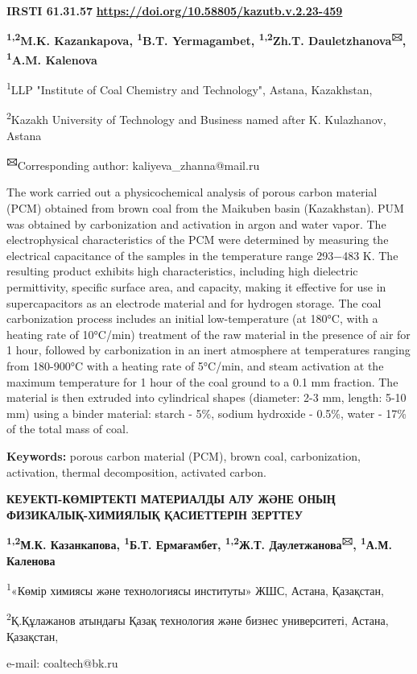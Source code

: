 \newpage
{\bfseries IRSTI 61.31.57}
\hfill {\bfseries \href{https://doi.org/10.58805/kazutb.v.2.23-459}{https://doi.org/10.58805/kazutb.v.2.23-459}}


\begin{center}
{\bfseries \textsuperscript{1,2}M.K. Kazankapova, \textsuperscript{1}B.T. Yermagambet, \textsuperscript{1,2}Zh.T. Dauletzhanova\textsuperscript{🖂}, \textsuperscript{1}A.M. Kalenova}

\textsuperscript{1}LLP "Institute of Coal Chemistry and Technology",
Astana, Kazakhstan,

\textsuperscript{2}Kazakh University of Technology and Business named
after K. Kulazhanov, Astana

{\bfseries \textsuperscript{🖂}}Corresponding author:
kaliyeva\_zhanna@mail.ru
\end{center}

The work carried out a physicochemical analysis of porous carbon
material (PCM) obtained from brown coal from the Maikuben basin
(Kazakhstan). PUM was obtained by carbonization and activation in argon
and water vapor. The electrophysical characteristics of the PCM were
determined by measuring the electrical capacitance of the samples in the
temperature range 293−483 K. The resulting product exhibits high
characteristics, including high dielectric permittivity, specific
surface area, and capacity, making it effective for use in
supercapacitors as an electrode material and for hydrogen storage. The
coal carbonization process includes an initial low-temperature (at
180°C, with a heating rate of 10°C/min) treatment of the raw material in
the presence of air for 1 hour, followed by carbonization in an inert
atmosphere at temperatures ranging from 180-900°C with a heating rate of
5°C/min, and steam activation at the maximum temperature for 1 hour of
the coal ground to a 0.1 mm fraction. The material is then extruded into
cylindrical shapes (diameter: 2-3 mm, length: 5-10 mm) using a binder
material: starch - 5\%, sodium hydroxide - 0.5\%, water - 17\% of the
total mass of coal.

{\bfseries Keywords:} porous carbon material (PCM), brown coal,
carbonization, activation, thermal decomposition, activated carbon.

\begin{center}
{\large\bfseries КЕУЕКТІ-КӨМІРТЕКТІ МАТЕРИАЛДЫ АЛУ ЖӘНЕ ОНЫҢ ФИЗИКАЛЫҚ-ХИМИЯЛЫҚ
ҚАСИЕТТЕРІН ЗЕРТТЕУ}

{\bfseries \textsuperscript{1,2}М.К. Казанкапова, \textsuperscript{1}Б.Т. Ермағамбет, \textsuperscript{1,2}Ж.Т. Даулетжанова\textsuperscript{🖂}, \textsuperscript{1}А.М. Каленова}

\textsuperscript{1}«Көмір химиясы және технологиясы институты» ЖШС,
Астана, Қазақстан,

\textsuperscript{2}Қ.Құлажанов атындағы Қазақ технология және бизнес
университеті, Астана, Қазақстан,

e-mail: coaltech@bk.ru
\end{center}

